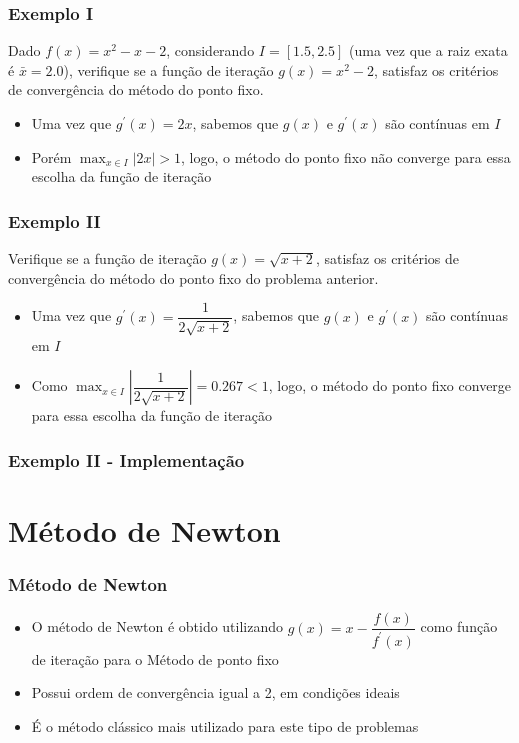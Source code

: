 \documentclass{beamer}
\theoremstyle{mystyle}
\begin{document}
\begin{frame}
	\frametitle{Exemplo I}
	Dado $ f (x) = x^{2} - x - 2 $, considerando $ I = [1.5, 2.5] $ (uma vez que a raiz exata é $ \bar{x} = 2.0 $), verifique se a função de iteração $ g(x) = x^{2} - 2 $, satisfaz os critérios de convergência do método do ponto fixo.
	\pause
	
	\begin{itemize}
		\item Uma vez que $ g^{\prime}(x) = 2x $, sabemos que $ g(x) $ e $ g^{\prime}(x) $ são contínuas em $ I $
		\item Porém $ \max_{x \in I}|2x| > 1 $, logo, o método do ponto fixo \alert{não converge} para essa escolha da função de iteração
	\end{itemize}
\end{frame}

\begin{frame}
	\frametitle{Exemplo II}
	Verifique se a função de iteração $ g(x) = \sqrt{x + 2} $, satisfaz os critérios de convergência do método do ponto fixo do problema anterior.
	\pause
	
	\begin{itemize}
		\item Uma vez que $ g^{\prime}(x) = \dfrac{1}{2\sqrt{x + 2}} $, sabemos que $ g(x) $ e $ g^{\prime}(x) $ são contínuas em $ I $
		\item Como $ \max_{x \in I} \left| \dfrac{1}{2\sqrt{x + 2}} \right| = 0.267 < 1 $, logo, o método do ponto fixo \alert{converge} para essa escolha da função de iteração
	\end{itemize}
\end{frame}

\begin{frame}
	\frametitle{Exemplo II - Implementação}
	\centering
	\href{https://colab.research.google.com/drive/1Ol4hdP697Brh07Daga9DyhJivxgfXbYK?usp=sharing}{}
\end{frame}

\section{Método de Newton}

\begin{frame}
	\frametitle{Método de Newton}
	\begin{itemize}
		\item O método de Newton é obtido utilizando $ g(x) = x - \dfrac{f(x)}{f^{\prime}(x)} $ como função de iteração para o Método de ponto fixo
		\item Possui ordem de convergência igual a 2, em condições ideais
		\item É o método clássico mais utilizado para este tipo de problemas
	\end{itemize}
\end{frame}
\end{document}
